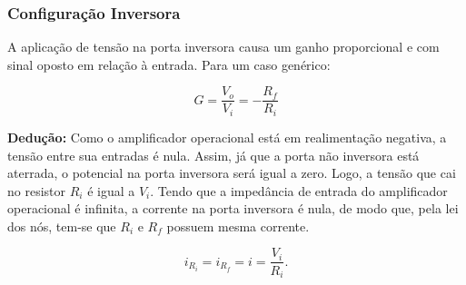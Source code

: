 \documentclass{article}
\numberwithin{equation}{section}
\newcommand{\curtovirtual}{($(opamp.+)+(0.3,0)$) to[open,v^=$ $, l=0, voltage shift=1] ($(opamp.-)+(0.3,0)$)}
\let\dfr\dfrac
\begin{document}
\subsubsection{Configuração Inversora}
A aplicação de tensão na porta inversora causa um ganho proporcional e com sinal oposto em relação à entrada. Para um caso genérico:

\begin{center}
\end{center}

\begin{equation}
    G=\frac{V_{o}}{V_{i}}=-\frac{R_{f}}{R_{i}}  \label{eq:ampop_inversor}
\end{equation}

\textbf{Dedução:} Como o amplificador operacional está em realimentação negativa, a tensão entre sua entradas é nula. Assim, já que a porta não inversora está aterrada, o potencial na porta inversora será igual a zero. Logo, a tensão que cai no resistor $R_i$ é igual a $V_i$. Tendo que a impedância de entrada do amplificador operacional é infinita, a corrente na porta inversora é nula, de modo que, pela lei dos nós, tem-se que $R_i$ e $R_f$ possuem mesma corrente.

\begin{center}
\end{center}

\begin{equation*}
    i_{R_i} = i_{R_f} = i = \dfr{V_i}{R_i}.
\end{equation*}
\end{document}
